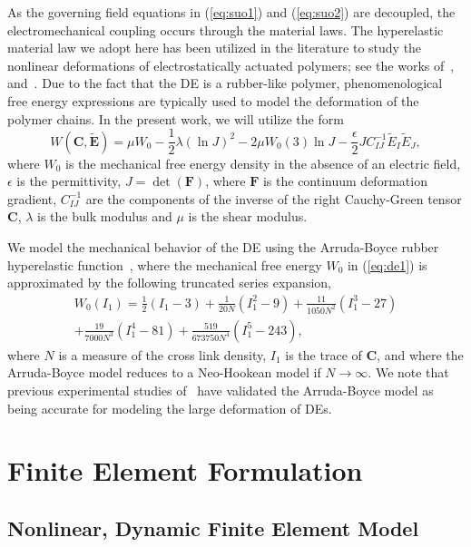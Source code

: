 \documentclass[final,authoryear,3p,times]{elsarticle}
\newcommand{\mbf}{\mathbf}
\begin{document}
As the governing field equations in (\ref{eq:suo1}) and (\ref{eq:suo2}) are decoupled, the electromechanical coupling occurs through the material laws.  The hyperelastic material law we adopt here has been utilized in the literature to study the nonlinear deformations of electrostatically actuated polymers; see the works of~\citet{vuIJNME2007}, and~\citet{zhaoAPL2007}.  Due to the fact that the DE is a rubber-like polymer, phenomenological free energy expressions are typically used to model the deformation of the polymer chains.  In the present work, we will utilize the form~\citep{vuIJNME2007,zhaoAPL2007}
\begin{equation}\label{eq:de1} W(\mbf{C},\tilde{\mbf{E}})=\mu W_{0}-\frac{1}{2}\lambda(\ln{J})^{2}-2\mu W_{0}(3)\ln{J}-\frac{\epsilon}{2}JC_{IJ}^{-1}\tilde{E}_{I}\tilde{E}_{J},
\end{equation}
where $W_{0}$ is the mechanical free energy density in the absence of an electric field, $\epsilon$ is the permittivity, $J=\det(\mbf{F})$, where $\mbf{F}$ is the continuum deformation gradient, $C_{IJ}^{-1}$ are the components of the inverse of the right Cauchy-Green tensor $\mbf{C}$, $\lambda$ is the bulk modulus and $\mu$ is the shear modulus.  

We model the mechanical behavior of the DE using the Arruda-Boyce rubber hyperelastic function~\citep{arrudaJMPS1993}, where the mechanical free energy $W_{0}$ in (\ref{eq:de1}) is approximated by the following truncated series expansion,
\begin{eqnarray}\label{eq:de2} W_{0}(I_{1})=\frac{1}{2}(I_{1}-3)+\frac{1}{20N}(I_{1}^{2}-9)+\frac{11}{1050N^{2}}(I_{1}^{3}-27) \\ \nonumber
+\frac{19}{7000N^{3}}(I_{1}^{4}-81)+\frac{519}{673750N^{4}}(I_{1}^{5}-243),
\end{eqnarray}
where $N$ is a measure of the cross link density, $I_{1}$ is the trace of $\mbf{C}$, and where the Arruda-Boyce model reduces to a Neo-Hookean model if $N\rightarrow\infty$.  We note that previous experimental studies of~\citet{wisslerSAA2007a} have validated the Arruda-Boyce model as being accurate for modeling the large deformation of DEs.  

\section{Finite Element Formulation}
\subsection{Nonlinear, Dynamic Finite Element Model}
\end{document}
